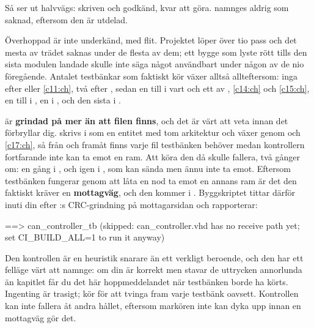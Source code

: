 Så ser  ut halvvägs:  skriven och godkänd, 
kvar att göra.  namnges aldrig som saknad, eftersom den är utdelad.

Överhoppad är inte underkänd, med flit. Projektet löper över tio pass och det mesta av trädet saknas
under de flesta av dem; ett bygge som lyste rött tills den sista modulen landade skulle inte säga
något användbart under någon av de nio föregående. Antalet testbänkar som faktiskt kör växer alltså
allteftersom: inga efter  eller \ref{c11:ch}, två efter , sedan en
till i vart och ett av , \ref{c14:ch} och \ref{c15:ch}, en till i ,
en i , och den sista i .

\begin{aside}
 är \textbf{grindad på mer än att filen finns}, och det är värt att veta
innan det förbryllar dig.  skrivs i  som en entitet med tom
arkitektur och växer genom  och \ref{c17:ch}, så från  och framåt
finns varje fil testbänken behöver medan kontrollern fortfarande inte kan ta emot en ram. Att köra
den då skulle fallera, två gånger om: en gång i , och igen i , som
kan sända men ännu inte ta emot. Eftersom testbänken fungerar genom att låta en nod ta emot en annans
ram är det den faktiskt kräver en \textbf{mottagväg}, och den kommer i .
Byggskriptet tittar därför inuti din  efter :s CRC-grindning
på mottagarsidan och rapporterar:

\begin{console}
==> can_controller_tb (skipped: can_controller.vhd has no receive path yet;
    set CI_BUILD_ALL=1 to run it anyway)
\end{console}

Den kontrollen är en heuristik snarare än ett verkligt beroende, och den har ett felläge värt att
namnge: om din  är korrekt men stavar de uttrycken annorlunda än kapitlet får du det
här hoppmeddelandet när testbänken borde ha körts. Ingenting är trasigt; kör
 för att tvinga fram varje testbänk oavsett. Kontrollen kan
inte fallera åt andra hållet, eftersom markören inte kan dyka upp innan en mottagväg gör det.
\end{aside}

